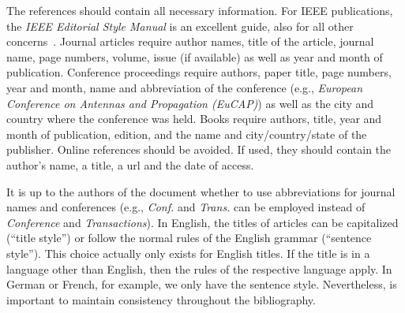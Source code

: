 The references should contain all necessary information. 
For IEEE publications, the \emph{IEEE Editorial Style Manual} is an excellent guide, also for all other concerns~\cite{IEEEStyle}. 
Journal articles require author names, title of the article, journal name, page numbers, volume, issue (if available) as well as year and month of publication. 
Conference proceedings require authors, paper title, page numbers, year and month, name and abbreviation of the conference (e.g., \emph{European Conference on Antennas and Propagation (EuCAP)}) as well as the city and country where the conference was held. 
Books require authors, title, year and month of publication, edition, and the name and city/country/state of the publisher.
Online references should be avoided.  
If used, they should contain the author's name, a title, a url and the date of access. 

It is up to the authors of the document whether to use abbreviations for journal names and conferences  (e.g., \emph{Conf.} and \emph{Trans.} can be employed instead of \emph{Conference} and \emph{Transactions}).
In English, the titles of articles can be capitalized (``title style'') or follow the normal rules of the English grammar (``sentence style'').
This choice actually only exists for English titles.
If the title is in a language other than English, then the rules of the respective language apply. 
In German or French, for example,  we only have the sentence style.
 Nevertheless, is important to maintain consistency throughout the bibliography. 

	